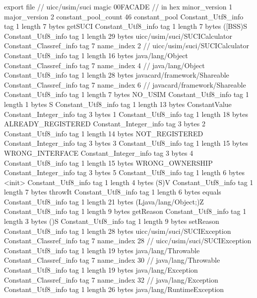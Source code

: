 export file {		// uicc/usim/suci
	magic	00FACADE		 // in hex
	minor_version	1
	major_version	2
	constant_pool_count	46
	constant_pool {
		Constant_Utf8_info {
			tag	1
			length	7
			bytes	getSUCI
		}
		Constant_Utf8_info {
			tag	1
			length	7
			bytes	([BSS)S
		}
		Constant_Utf8_info {
			tag	1
			length	29
			bytes	uicc/usim/suci/SUCICalculator
		}
		Constant_Classref_info {
			tag	7
			name_index	2		// uicc/usim/suci/SUCICalculator
		}
		Constant_Utf8_info {
			tag	1
			length	16
			bytes	java/lang/Object
		}
		Constant_Classref_info {
			tag	7
			name_index	4		// java/lang/Object
		}
		Constant_Utf8_info {
			tag	1
			length	28
			bytes	javacard/framework/Shareable
		}
		Constant_Classref_info {
			tag	7
			name_index	6		// javacard/framework/Shareable
		}
		Constant_Utf8_info {
			tag	1
			length	7
			bytes	NO_USIM
		}
		Constant_Utf8_info {
			tag	1
			length	1
			bytes	S
		}
		Constant_Utf8_info {
			tag	1
			length	13
			bytes	ConstantValue
		}
		Constant_Integer_info {
			tag	3
			bytes	1
		}
		Constant_Utf8_info {
			tag	1
			length	18
			bytes	ALREADY_REGISTERED
		}
		Constant_Integer_info {
			tag	3
			bytes	2
		}
		Constant_Utf8_info {
			tag	1
			length	14
			bytes	NOT_REGISTERED
		}
		Constant_Integer_info {
			tag	3
			bytes	3
		}
		Constant_Utf8_info {
			tag	1
			length	15
			bytes	WRONG_INTERFACE
		}
		Constant_Integer_info {
			tag	3
			bytes	4
		}
		Constant_Utf8_info {
			tag	1
			length	15
			bytes	WRONG_OWNERSHIP
		}
		Constant_Integer_info {
			tag	3
			bytes	5
		}
		Constant_Utf8_info {
			tag	1
			length	6
			bytes	<init>
		}
		Constant_Utf8_info {
			tag	1
			length	4
			bytes	(S)V
		}
		Constant_Utf8_info {
			tag	1
			length	7
			bytes	throwIt
		}
		Constant_Utf8_info {
			tag	1
			length	6
			bytes	equals
		}
		Constant_Utf8_info {
			tag	1
			length	21
			bytes	(Ljava/lang/Object;)Z
		}
		Constant_Utf8_info {
			tag	1
			length	9
			bytes	getReason
		}
		Constant_Utf8_info {
			tag	1
			length	3
			bytes	()S
		}
		Constant_Utf8_info {
			tag	1
			length	9
			bytes	setReason
		}
		Constant_Utf8_info {
			tag	1
			length	28
			bytes	uicc/usim/suci/SUCIException
		}
		Constant_Classref_info {
			tag	7
			name_index	28		// uicc/usim/suci/SUCIException
		}
		Constant_Utf8_info {
			tag	1
			length	19
			bytes	java/lang/Throwable
		}
		Constant_Classref_info {
			tag	7
			name_index	30		// java/lang/Throwable
		}
		Constant_Utf8_info {
			tag	1
			length	19
			bytes	java/lang/Exception
		}
		Constant_Classref_info {
			tag	7
			name_index	32		// java/lang/Exception
		}
		Constant_Utf8_info {
			tag	1
			length	26
			bytes	java/lang/RuntimeException
}}}
